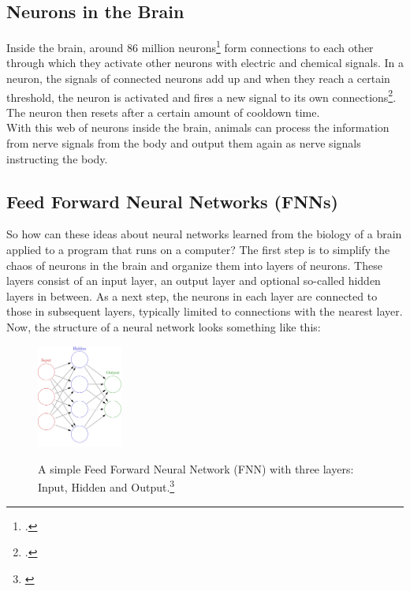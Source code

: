 \documentclass[11pt]{report}
\begin{document}
    \subsection{Neurons in the Brain}\label{subsec:neurons-in-the-brain}
    Inside the brain, around 86 million neurons\footcite{caruso_23} form connections to each other through which they activate other neurons with electric and chemical signals.
    In a neuron, the signals of connected neurons add up and when they reach a certain threshold, the neuron is activated and fires a new signal to its own connections\footcite{Newman_23}.
    The neuron then resets after a certain amount of cooldown time.
    \\
    With this web of neurons inside the brain, animals can process the information from nerve signals from the body and output them again as nerve signals instructing the body.

    \subsection{Feed Forward Neural Networks (FNNs)}\label{subsec:feed-forward-neural-networks-(fnns)}
    So how can these ideas about neural networks learned from the biology of a brain applied to a program that runs on a computer?
    The first step is to simplify the chaos of neurons in the brain and organize them into layers of neurons.
    These layers consist of an input layer, an output layer and optional so-called hidden layers in between.
    As a next step, the neurons in each layer are connected to those in subsequent layers, typically limited to connections with the nearest layer.
    \\
    Now, the structure of a neural network looks something like this:
    \begin{figure}[H]
        \centering
        \includegraphics[width=0.25\textwidth]{nn_simple_1}~\caption{A simple Feed Forward Neural Network (FNN) with three layers: Input, Hidden and Output.\footnote{\cite{nn_simple_img_1}}}
        \label{fig:nn_simple_1}
    \end{figure}
\end{document}
